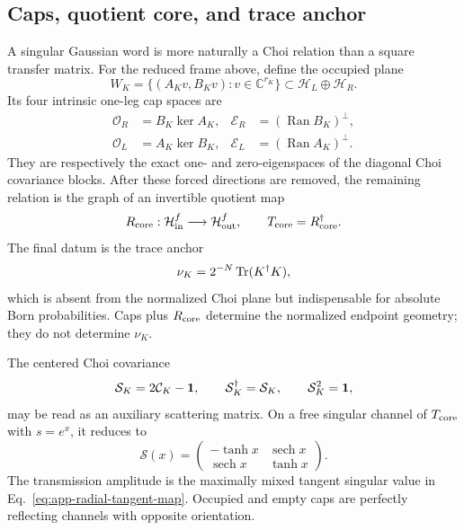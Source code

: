 \subsection{Caps, quotient core, and trace anchor}
\label{app:cap-core-anchor}

A singular Gaussian word is more naturally a Choi relation than a square
transfer matrix.  For the reduced frame above, define the occupied plane
\begin{equation}
    W_K=\{(A_Kv,B_Kv):v\in\mathbb C^{r_K}\}
    \subset\mathcal H_L\oplus\mathcal H_R.
\end{equation}
Its four intrinsic one-leg cap spaces are
\begin{equation}
    \begin{aligned}
      \mathcal O_R&=B_K\ker A_K,
      &\mathcal E_R&=(\operatorname{Ran}B_K)^\perp,\\
      \mathcal O_L&=A_K\ker B_K,
      &\mathcal E_L&=(\operatorname{Ran}A_K)^\perp.
    \end{aligned}
    \label{eq:app-four-caps}
\end{equation}
They are respectively the exact one- and zero-eigenspaces of the diagonal
Choi covariance blocks.  After these forced directions are removed, the
remaining relation is the graph of an invertible quotient map
\begin{equation}
    R_{\rm core}:\mathcal H_{\rm in}^{f}
    \longrightarrow\mathcal H_{\rm out}^{f},
    \qquad
    T_{\rm core}=R_{\rm core}^\dagger.
    \label{eq:app-quotient-core}
\end{equation}
The final datum is the trace anchor
\begin{equation}
    \nu_K=2^{-N}\operatorname{Tr}(K^\dagger K),
    \label{eq:app-trace-anchor}
\end{equation}
which is absent from the normalized Choi plane but indispensable for absolute
Born probabilities.  Caps plus \(R_{\rm core}\) determine the normalized
endpoint geometry; they do not determine \(\nu_K\).

The centered Choi covariance
\begin{equation}
    \mathcal S_K=2\mathcal C_K-\mathbf{1},
    \qquad
    \mathcal S_K^\dagger=\mathcal S_K,
    \qquad
    \mathcal S_K^2=\mathbf{1},
    \label{eq:app-auxiliary-scatterer}
\end{equation}
may be read as an auxiliary scattering matrix.  On a free singular channel
of \(T_{\rm core}\) with \(s=e^x\), it reduces to
\begin{equation}
    \mathcal S(x)=
    \begin{pmatrix}
      -\tanh x&\operatorname{sech}x\\
      \operatorname{sech}x&\tanh x
    \end{pmatrix}.
    \label{eq:app-radial-scatterer}
\end{equation}
The transmission amplitude is the maximally mixed tangent singular value in
Eq.~\eqref{eq:app-radial-tangent-map}.  Occupied and empty caps are perfectly
reflecting channels with opposite orientation.

